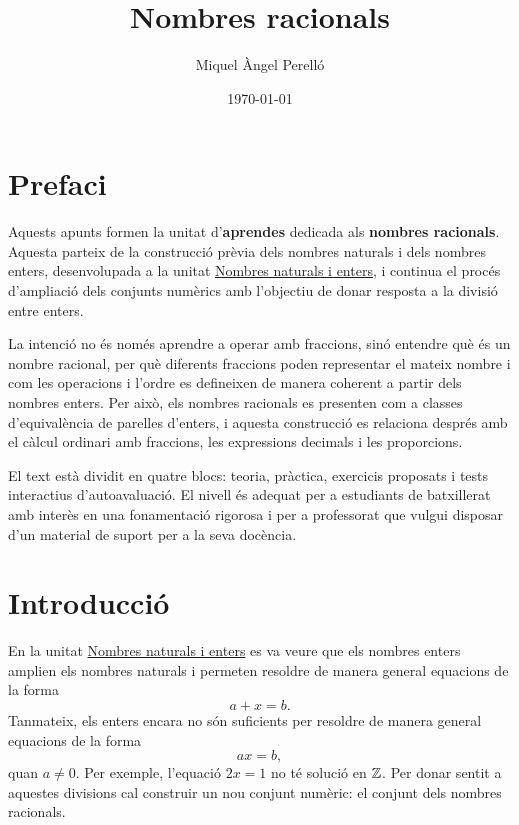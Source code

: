 \documentclass[12pt,a4paper,oneside]{book}
\begin{document}
	\pagecolor{fons!20}
	
	\frontmatter
	
	\title{Nombres racionals}
	\author{Miquel Àngel Perelló}
	\date{\today}
	
	
	\maketitle
	\tableofcontents
	
	\let\cleardoublepage\clearpage
	
	\chapter*{Prefaci}
	
	Aquests apunts formen la unitat d'\textbf{aprendes} dedicada als \textbf{nombres racionals}. Aquesta parteix de la construcció prèvia dels nombres naturals i dels nombres enters, desenvolupada a la unitat \href{https://aprendes.com/batxillerat/nombres/main.pdf}{Nombres naturals i enters}, i continua el procés d'ampliació dels conjunts numèrics amb l'objectiu de donar resposta a la divisió entre enters.
	
	La intenció no és només aprendre a operar amb fraccions, sinó entendre què és un nombre racional, per què diferents fraccions poden representar el mateix nombre i com les operacions i l'ordre es defineixen de manera coherent a partir dels nombres enters. Per això, els nombres racionals es presenten com a classes d'equivalència de parelles d'enters, i aquesta construcció es relaciona després amb el càlcul ordinari amb fraccions, les expressions decimals i les proporcions.
	
	El text està dividit en quatre blocs: teoria, pràctica, exercicis proposats i tests interactius d'autoavaluació. El nivell és adequat per a estudiants de batxillerat amb interès en una fonamentació rigorosa i per a professorat que vulgui disposar d'un material de suport per a la seva docència.
	
	\chapter{Introducció}
	
	En la unitat \href{https://aprendes.com/batxillerat/nombres/main.pdf}{Nombres naturals i enters} es va veure que els nombres enters amplien els nombres naturals i permeten resoldre de manera general equacions de la forma
	\[
	a+x=b.
	\]
	Tanmateix, els enters encara no són suficients per resoldre de manera general equacions de la forma
	\[
	ax=b,
	\]
	quan \(a\ne 0\). Per exemple, l'equació \(2x=1\) no té solució en \(\mathbb{Z}\). Per donar sentit a aquestes divisions cal construir un nou conjunt numèric: el conjunt dels nombres racionals.
	
\end{document}
